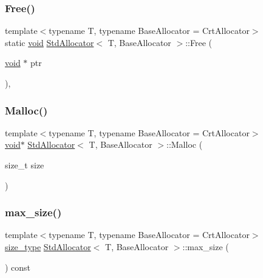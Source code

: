 \subsubsection{\texorpdfstring{Free()}{Free()}}
{\footnotesize\ttfamily template$<$typename T, typename Base\+Allocator = Crt\+Allocator$>$ \\
static \hyperlink{imgui__impl__opengl3__loader_8h_ac668e7cffd9e2e9cfee428b9b2f34fa7}{void} \hyperlink{classStdAllocator}{Std\+Allocator}$<$ T, Base\+Allocator $>$\+::Free (\begin{DoxyParamCaption}\item[{\hyperlink{imgui__impl__opengl3__loader_8h_ac668e7cffd9e2e9cfee428b9b2f34fa7}{void} $\ast$}]{ptr }\end{DoxyParamCaption})\hspace{0.3cm}{\ttfamily [inline]}, {\ttfamily [static]}}

\mbox{\label{classStdAllocator_ac56f94d87a4e3864ede25f65602daf64}} 
\subsubsection{\texorpdfstring{Malloc()}{Malloc()}}
{\footnotesize\ttfamily template$<$typename T, typename Base\+Allocator = Crt\+Allocator$>$ \\
\hyperlink{imgui__impl__opengl3__loader_8h_ac668e7cffd9e2e9cfee428b9b2f34fa7}{void}$\ast$ \hyperlink{classStdAllocator}{Std\+Allocator}$<$ T, Base\+Allocator $>$\+::Malloc (\begin{DoxyParamCaption}\item[{size\+\_\+t}]{size }\end{DoxyParamCaption})\hspace{0.3cm}{\ttfamily [inline]}}

\mbox{\label{classStdAllocator_a158b8ba5e88fbcd7a851541090654930}} 
\subsubsection{\texorpdfstring{max\+\_\+size()}{max\_size()}}
{\footnotesize\ttfamily template$<$typename T, typename Base\+Allocator = Crt\+Allocator$>$ \\
\hyperlink{classStdAllocator_af0b177dc293fe5b985ba9e27de23b2c1}{size\+\_\+type} \hyperlink{classStdAllocator}{Std\+Allocator}$<$ T, Base\+Allocator $>$\+::max\+\_\+size (\begin{DoxyParamCaption}{ }\end{DoxyParamCaption}) const\hspace{0.3cm}{\ttfamily [inline]}}


